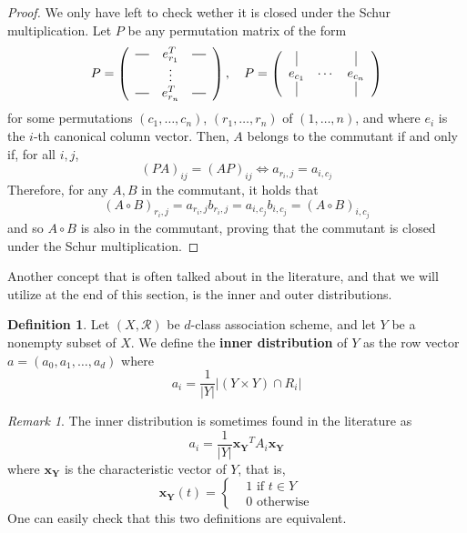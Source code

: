 \documentclass[a4paper,12pt]{article}
\newcommand*{\horzbar}{\rule[.5ex]{2.5ex}{0.5pt}}
\theoremstyle{plain}
\theoremstyle{definition}
\newtheorem{definition}[theorem]{Definition}
\theoremstyle{remark}
\newtheorem{remark}[theorem]{Remark}
\begin{document}
\begin{proof}
    We only have left to check wether it is closed under the Schur multiplication.
    Let $ P $ be any permutation matrix of the form
    \[
        P = \left (
        \begin{array}{ccc}
            \horzbar & e_{r_1}^T & \horzbar \\
                     & \vdots & \\
            \horzbar & e_{r_n}^T & \horzbar
        \end{array}
        \right ), \quad
        P = \left (
        \begin{array}{ccc}
            \vline  &  & \vline \\
            e_{c_1} & \cdots & e_{c_n} \\
            \vline & & \vline
        \end{array}
        \right )
    \]
    for some permutations $ (c_1,\dots,c_n) $, $ (r_1,\dots,r_n) $ of
    $ (1,\dots,n) $, and where $ e_i $ is the
    $ i $-th canonical column vector. Then, $ A $ belongs to the commutant if
    and only if, for all $ i,j $,
    \[ (PA)_{ij} = (AP)_{ij} \iff a_{r_i,j} = a_{i,c_j}  \]
    Therefore, for any $ A,B $ in the commutant, it holds that
    \[ (A \circ B)_{r_i,j} = a_{r_i,j}b_{r_i,j} = a_{i,c_j}b_{i,c_j} =
    (A \circ B)_{i,c_j} \]
    and so $ A \circ B $ is also in the commutant, proving that the commutant
    is closed under the Schur multiplication.
\end{proof}

Another concept that is often talked about in the literature, and that we will
utilize at the end of this section, is the inner and outer distributions.
\begin{definition}
    Let $ (X,\mathcal{R}) $ be $ d $-class association scheme, and let $ Y $
    be a nonempty subset of $ X $. We define the \textbf{inner distribution} of
    $ Y $ as the row vector $ a = ( a_0, a_1, \dots,a_d ) $ where
    \[ a_i = \frac{1}{|Y|}|(Y\times Y)\cap R_i| \]
\end{definition}
\begin{remark}
    The inner distribution is sometimes found in the literature as
    \[ a_i = \frac{1}{|Y|}\boldsymbol{x_Y}^T A_i \boldsymbol{x_Y} \]
    where $ \boldsymbol{x_Y} $ is the characteristic vector of $ Y $, that is,
    \[ \boldsymbol{x_Y}(t) = \begin{cases}
        &1 \text{ if } t \in Y \\
        &0 \text{ otherwise}
    \end{cases} \]
    One can easily check that this two definitions are equivalent.
\end{remark}
\end{document}
